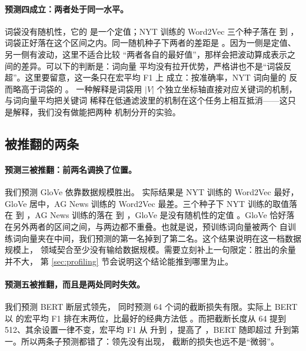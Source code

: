 \documentclass[11pt]{article}
\begin{document}
\paragraph{预测四成立：两者处于同一水平。} 词袋没有随机性，它的 \resultBowFOne{}
是一个定值；NYT 训练的 Word2Vec 三个种子落在 \resultNytVecWorst{} 到
\resultNytVecBest{}，词袋正好落在这个区间之内。同一随机种子下两者的差距是
\resultNytOverBowSameSeed{}。因为一侧是定值、另一侧有波动，这里不适合比较
``两者各自的最好值''，那样会把波动算成表示之间的差异。可以下的判断是：词向量
平均没有拉开优势，严格讲也不是``词袋反超''。这里要留意，这一条只在宏平均 F1 上
成立：按准确率，NYT 词向量的 \resultNytVecAcc{} 反而略高于词袋的 \resultBowAcc{}。
一种解释是词袋用 $|V|$ 个独立坐标轴直接对应关键词的机制，与词向量平均把关键词
稀释在低通滤波里的机制在这个任务上相互抵消——这只是解释，我们没有做能把两种
机制分开的实验。

\subsection{被推翻的两条}

\paragraph{预测三被推翻：前两名调换了位置。} 我们预测 GloVe 依靠数据规模胜出。
实际结果是 NYT 训练的 Word2Vec 最好，GloVe 居中，AG News 训练的 Word2Vec
最差。三个种子下 NYT 训练的取值落在 \resultNytVecWorst{} 到
\resultNytVecBest{}，AG News 训练的落在 \resultAgVecWorst{} 到
\resultAgVecBest{}，GloVe 是没有随机性的定值 \resultGloveScore{}。GloVe
恰好落在另外两者的区间之间，与两边都不重叠。也就是说，预训练词向量被两个
自训练词向量夹在中间，我们预测的第一名掉到了第二名。这个结果说明在这一档数据规模上，
领域契合至少没有输给数据规模。需要立刻补上一句限定：胜出的余量并不大，
第 \ref{sec:profiling} 节会说明这个结论能推到哪里为止。

\paragraph{预测五被推翻，而且是两处同时失效。} 我们预测 BERT 断层式领先，
同时预测 64 个词的截断损失有限。实际上 BERT 以 \resultBertFOne{} 的宏平均 F1
排在末两位，比最好的经典方法低 \resultBertGapToBestAbs{}。而把截断长度从
64 提到 512、其余设置一律不变，宏平均 F1 从 \resultBertFOne{} 升到
\resultBertLenFOne{}，提高了 \resultBertTruncFOneDeltaUns{}，BERT 随即超过
\resultBestNonBert{} 升到第一。所以两条子预测都错了：领先没有出现，
截断的损失也远不是``微弱''。
\end{document}
